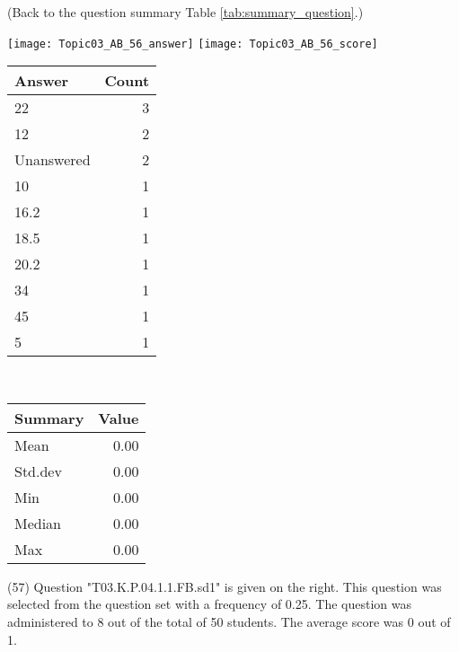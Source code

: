 \documentclass[12pt,english,nohyper]{tufte-handout}\usepackage[]{graphicx}\usepackage[]{color}
\begin{document}
 (Back to the question summary Table \ref{tab:summary_question}.)

\begin{center} \texttt{[image: Topic03\_AB\_56\_answer]} \texttt{[image: Topic03\_AB\_56\_score]} \end{center} 

\begin{center}%
\begin{tabular}{lr}
  \hline
Answer & Count \\ 
  \hline
22 &   3 \\ 
  12 &   2 \\ 
  Unanswered &   2 \\ 
  10 &   1 \\ 
  16.2 &   1 \\ 
  18.5 &   1 \\ 
  20.2 &   1 \\ 
  34 &   1 \\ 
  45 &   1 \\ 
  5 &   1 \\ 
   \hline
\end{tabular}
~~~~~~~~%
\begin{tabular}{lr}
  \hline
Summary & Value \\ 
  \hline
Mean & 0.00 \\ 
  Std.dev & 0.00 \\ 
  Min & 0.00 \\ 
  Median & 0.00 \\ 
  Max & 0.00 \\ 
   \hline
\end{tabular}
\end{center}\newpage{} (57) Question "T03.K.P.04.1.1.FB.sd1" is given on the right. This question was selected from the question set with a frequency of 0.25. The question was administered to 8 out of the total of 50 students. The average score was 0 out of 1.
\end{document}
